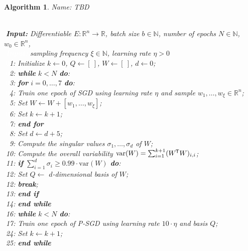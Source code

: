 \documentclass[11pt, a4paper]{article}
\newtheorem{algorithm}[theorem]{Algorithm}
\newcommand{\N}{\mathbb{N}}
\newcommand{\R}{\mathbb{R}}
\newcommand*{\tr}{^{\mkern-1.5mu\mathsf{T}}}
\begin{document}
\begin{algorithm}
\caption{Name: TBD \textcolor{white}{$\Big |$}} \ \\
\textcolor{white}{$\Big |$}\textbf{Input:} Differentiable $E: \R^n \to \R$, batch size $b \in \N$, number of epochs $N \in \N$, $w_0 \in \R^n$, \\
\textcolor{white}{$\Big |$\textbf{Input:}} sampling frequency $\xi \in \N$, learning rate $\eta > 0$ \\
\textcolor{white}{$\Big |0$}1: Initialize $k \leftarrow 0$, $Q \leftarrow [ \ ]$, $W \leftarrow [ \ ]$, $d \leftarrow 0$; \\
\textcolor{white}{$\Big |0$}2: \textbf{while} $k<N$ \textbf{do}: \\
\textcolor{white}{$\Big |0$}3: \quad \textbf{for} $i=0, \dots, 7$ \textbf{do}: \\
\textcolor{white}{$\Big |0$}4: \quad \quad Train one epoch of SGD using learning rate $\eta$ and sample $w_1, \dots, w_\xi \in \R^n$; \\
\textcolor{white}{$\Big |0$}5: \quad \quad Set $W \leftarrow W + [w_1, \dots, w_\xi]$; \\
\textcolor{white}{$\Big |0$}6: \quad \quad Set $k \leftarrow k+1$; \\
\textcolor{white}{$\Big |0$}7: \quad \textbf{end for} \\
\textcolor{white}{$\Big |0$}8: \quad Set $d \leftarrow d+5$; \\
\textcolor{white}{$\Big |0$}9: \quad Compute the singular values $\sigma_1, \dots, \sigma_d$ of $W$; \\
\textcolor{white}{$\Big |$}10: \quad Compute the overall variability $\text{var}(W) = \sum_{i=1}^{k+1} (W\tr W)_{i,i}$; \\
\textcolor{white}{$\Big |$}11: \quad \textbf{if} $\sum_{i=1}^{d} \sigma_i \geq 0.99 \cdot \text{var}(W)$ \textbf{do}: \\
\textcolor{white}{$\Big |$}12: \quad Set $Q \leftarrow$ $d$-dimensional basis of $W$; \\
\textcolor{white}{$\Big |$}12: \quad \quad \textbf{break}; \\
\textcolor{white}{$\Big |$}13: \quad \textbf{end if} \\
\textcolor{white}{$\Big |$}14: \textbf{end while} \\
\textcolor{white}{$\Big |$}16: \textbf{while} $k<N$ \textbf{do}: \\
\textcolor{white}{$\Big |$}17: \quad Train one epoch of P-SGD using learning rate $10\cdot\eta$ and basis $Q$; \\
\textcolor{white}{$\Big |$}24: \quad Set $k \leftarrow k+1$; \\
\textcolor{white}{$\Big |$}25: \textbf{end while} \\
\end{algorithm}
\end{document}
